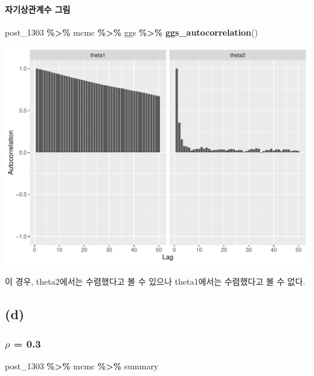 \documentclass[
]{article}
\newenvironment{Shaded}{\begin{snugshade}}{\end{snugshade}}
\newcommand{\FunctionTok}[1]{\textcolor[rgb]{0.13,0.29,0.53}{\textbf{#1}}}
\newcommand{\NormalTok}[1]{#1}
\newcommand{\SpecialCharTok}[1]{\textcolor[rgb]{0.81,0.36,0.00}{\textbf{#1}}}
\begin{document}
\paragraph{자기상관계수
그림}\label{uxc790uxae30uxc0c1uxad00uxacc4uxc218-uxadf8uxb9bc-3}

\begin{Shaded}
\begin{Highlighting}[]
\NormalTok{post\_1303 }\SpecialCharTok{\%\textgreater{}\%}\NormalTok{ mcmc }\SpecialCharTok{\%\textgreater{}\%}\NormalTok{ ggs }\SpecialCharTok{\%\textgreater{}\%} \FunctionTok{ggs\_autocorrelation}\NormalTok{()}
\end{Highlighting}
\end{Shaded}

\begin{center}\includegraphics[width=0.8\linewidth]{Bayes_stat_hw3_files/figure-latex/unnamed-chunk-26-1} \end{center}

이 경우, theta2에서는 수렴했다고 볼 수 있으나 theta1에서는 수렴했다고 볼
수 없다.

\subsection{(d)}\label{d-1}

\subsubsection{\texorpdfstring{\(\rho\) =
0.3}{\textbackslash rho = 0.3}}\label{rho-0.3-2}

\begin{Shaded}
\begin{Highlighting}[]
\NormalTok{post\_1303 }\SpecialCharTok{\%\textgreater{}\%}\NormalTok{ mcmc }\SpecialCharTok{\%\textgreater{}\%}\NormalTok{ summary}
\end{Highlighting}
\end{Shaded}
\end{document}

